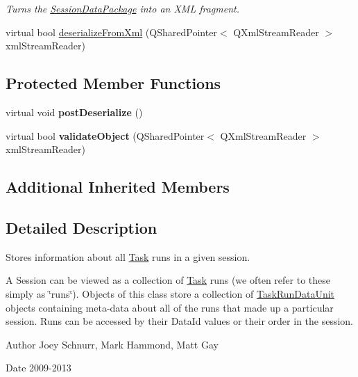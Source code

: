 \begin{DoxyCompactItemize}
\begin{DoxyCompactList}\small\item\em Turns the \hyperlink{class_picto_1_1_session_data_package}{Session\-Data\-Package} into an X\-M\-L fragment. \end{DoxyCompactList}\item 
virtual bool \hyperlink{class_picto_1_1_session_data_package_ad21415e53fb12b6e1eb5b32e24403587}{deserialize\-From\-Xml} (Q\-Shared\-Pointer$<$ Q\-Xml\-Stream\-Reader $>$ xml\-Stream\-Reader)
\end{DoxyCompactItemize}
\subsection*{Protected Member Functions}
\begin{DoxyCompactItemize}
\item 
\hypertarget{class_picto_1_1_session_data_package_a4457d94b2f6c0a89504e07e6652100e5}{virtual void {\bfseries post\-Deserialize} ()}\label{class_picto_1_1_session_data_package_a4457d94b2f6c0a89504e07e6652100e5}

\item 
\hypertarget{class_picto_1_1_session_data_package_a6098d50c4db4e9d70cdaed429aa6ef16}{virtual bool {\bfseries validate\-Object} (Q\-Shared\-Pointer$<$ Q\-Xml\-Stream\-Reader $>$ xml\-Stream\-Reader)}\label{class_picto_1_1_session_data_package_a6098d50c4db4e9d70cdaed429aa6ef16}

\end{DoxyCompactItemize}
\subsection*{Additional Inherited Members}


\subsection{Detailed Description}
Stores information about all \hyperlink{class_picto_1_1_task}{Task} runs in a given session. 

A Session can be viewed as a collection of \hyperlink{class_picto_1_1_task}{Task} runs (we often refer to these simply as \char`\"{}runs\char`\"{}). Objects of this class store a collection of \hyperlink{class_picto_1_1_task_run_data_unit}{Task\-Run\-Data\-Unit} objects containing meta-\/data about all of the runs that made up a particular session. Runs can be accessed by their Data\-Id values or their order in the session. \begin{DoxyAuthor}{Author}
Joey Schnurr, Mark Hammond, Matt Gay 
\end{DoxyAuthor}
\begin{DoxyDate}{Date}
2009-\/2013 
\end{DoxyDate}


